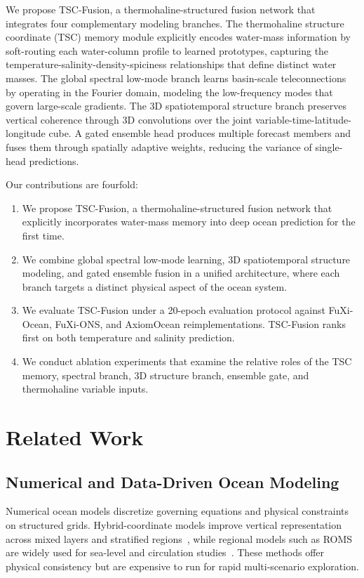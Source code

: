 \documentclass[conference]{IEEEtran}
\begin{document}
We propose TSC-Fusion, a thermohaline-structured fusion network that integrates four complementary modeling branches. The thermohaline structure coordinate (TSC) memory module explicitly encodes water-mass information by soft-routing each water-column profile to learned prototypes, capturing the temperature-salinity-density-spiciness relationships that define distinct water masses. The global spectral low-mode branch learns basin-scale teleconnections by operating in the Fourier domain, modeling the low-frequency modes that govern large-scale gradients. The 3D spatiotemporal structure branch preserves vertical coherence through 3D convolutions over the joint variable-time-latitude-longitude cube. A gated ensemble head produces multiple forecast members and fuses them through spatially adaptive weights, reducing the variance of single-head predictions.

Our contributions are fourfold:
\begin{enumerate}
    \item We propose TSC-Fusion, a thermohaline-structured fusion network that explicitly incorporates water-mass memory into deep ocean prediction for the first time.
    \item We combine global spectral low-mode learning, 3D spatiotemporal structure modeling, and gated ensemble fusion in a unified architecture, where each branch targets a distinct physical aspect of the ocean system.
    \item We evaluate TSC-Fusion under a 20-epoch evaluation protocol against FuXi-Ocean, FuXi-ONS, and AxiomOcean reimplementations. TSC-Fusion ranks first on both temperature and salinity prediction.
    \item We conduct ablation experiments that examine the relative roles of the TSC memory, spectral branch, 3D structure branch, ensemble gate, and thermohaline variable inputs.
\end{enumerate}

\section{Related Work}

\subsection{Numerical and Data-Driven Ocean Modeling}

Numerical ocean models discretize governing equations and physical constraints on structured grids. Hybrid-coordinate models improve vertical representation across mixed layers and stratified regions~\cite{bleckOceanicGeneralCirculation2002}, while regional models such as ROMS are widely used for sea-level and circulation studies~\cite{LiZhenXiTaiPingYangYangLiuXiTongDuiHaiPingMianGaoDuBianHuaDeXiangYingJiYuQuYuHaiYangMoShiROMSShiYan2025}. These methods offer physical consistency but are expensive to run for rapid multi-scenario exploration.
\end{document}
